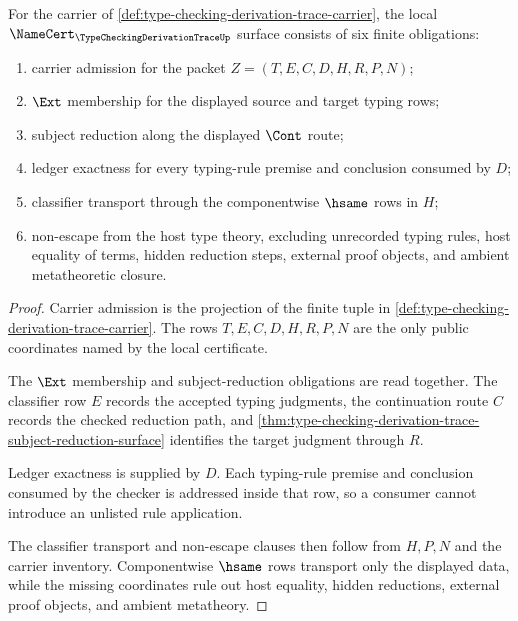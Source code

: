 \begin{theorem}
\label{thm:type-checking-derivation-trace-namecert-obligations}
For the carrier of \autoref{def:type-checking-derivation-trace-carrier}, the local $\NameCert_{\TypeCheckingDerivationTraceUp}$ surface consists of six finite obligations:
\begin{enumerate}
\item carrier admission for the packet $Z=(T,E,C,D,H,R,P,N)$;
\item $\Ext$ membership for the displayed source and target typing rows;
\item subject reduction along the displayed $\Cont$ route;
\item ledger exactness for every typing-rule premise and conclusion consumed by $D$;
\item classifier transport through the componentwise $\hsame$ rows in $H$;
\item non-escape from the host type theory, excluding unrecorded typing rules, host equality of terms, hidden reduction steps, external proof objects, and ambient metatheoretic closure.
\end{enumerate}
\end{theorem}
\begin{proof}
Carrier admission is the projection of the finite tuple in \autoref{def:type-checking-derivation-trace-carrier}. The rows $T,E,C,D,H,R,P,N$ are the only public coordinates named by the local certificate.

The $\Ext$ membership and subject-reduction obligations are read together. The classifier row $E$ records the accepted typing judgments, the continuation route $C$ records the checked reduction path, and \autoref{thm:type-checking-derivation-trace-subject-reduction-surface} identifies the target judgment through $R$.

Ledger exactness is supplied by $D$. Each typing-rule premise and conclusion consumed by the checker is addressed inside that row, so a consumer cannot introduce an unlisted rule application.

The classifier transport and non-escape clauses then follow from $H,P,N$ and the carrier inventory. Componentwise $\hsame$ rows transport only the displayed data, while the missing coordinates rule out host equality, hidden reductions, external proof objects, and ambient metatheory.
\end{proof}

